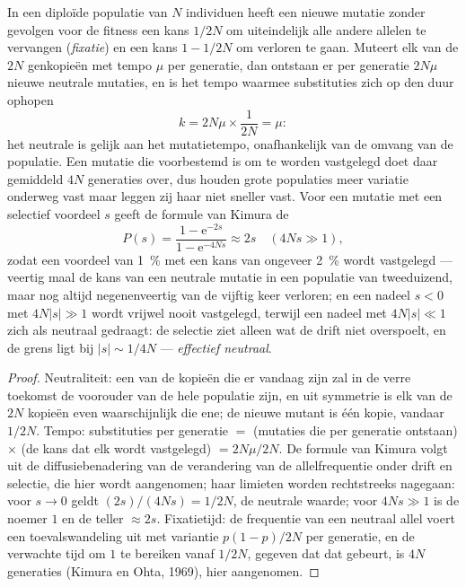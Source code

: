 \begin{theorem}\label{thm:b3:molecular-evolution:neutral}
In een diploïde populatie van $N$ individuen heeft een nieuwe mutatie
zonder gevolgen voor de fitness een kans $1/2N$ om uiteindelijk alle
andere allelen te vervangen (\emph{fixatie}) en een kans $1 - 1/2N$ om
verloren te gaan. Muteert elk van de $2N$ genkopieën met tempo $\mu$
per generatie, dan ontstaan er per generatie $2N\mu$ nieuwe neutrale
mutaties, en is het tempo waarmee substituties zich op den duur ophopen
\[
k = 2N\mu\times\frac{1}{2N} = \mu :
\]
het neutrale \emph{} is gelijk aan het mutatietempo,
onafhankelijk van de omvang van de populatie. Een mutatie die
voorbestemd is om te worden vastgelegd doet daar gemiddeld $4N$
generaties over, dus houden grote populaties meer variatie onderweg
vast maar leggen zij haar niet sneller vast. Voor een mutatie met een
selectief voordeel $s$ geeft de formule van Kimura de 
\[
P(s) = \frac{1 - \mathrm{e}^{-2s}}{1 - \mathrm{e}^{-4Ns}} \approx 2s
\quad (4Ns \gg 1),
\]
zodat een voordeel van \qty{1}{\%} met een kans van ongeveer
\qty{2}{\%} wordt vastgelegd --- veertig maal de kans van een neutrale
mutatie in een populatie van tweeduizend, maar nog altijd
negenenveertig van de vijftig keer verloren; en een nadeel $s < 0$ met
$4N|s| \gg 1$ wordt vrijwel nooit vastgelegd, terwijl een nadeel met
$4N|s| \ll 1$ zich als neutraal gedraagt: de selectie ziet alleen wat
de drift niet overspoelt, en de grens ligt bij $|s| \sim
1/4N$ --- \emph{effectief neutraal}.
\end{theorem}
\begin{proof}
Neutraliteit: een van de kopieën die er vandaag zijn zal in de verre
toekomst de voorouder van de hele populatie zijn, en uit symmetrie is
elk van de $2N$ kopieën even waarschijnlijk die ene; de nieuwe mutant
is één kopie, vandaar $1/2N$. Tempo: substituties per generatie $=$
(mutaties die per generatie ontstaan) $\times$ (de kans dat elk wordt
vastgelegd) $= 2N\mu/2N$. De formule van Kimura volgt uit de
diffusiebenadering van de verandering van de allelfrequentie onder
drift en selectie, die hier wordt aangenomen; haar limieten worden
rechtstreeks nagegaan: voor $s \to 0$ geldt $(2s)/(4Ns) = 1/2N$, de
neutrale waarde; voor $4Ns \gg 1$ is de noemer $1$ en de teller
$\approx 2s$. Fixatietijd: de frequentie van een neutraal allel voert
een toevalswandeling uit met variantie $p(1-p)/2N$ per generatie, en de
verwachte tijd om $1$ te bereiken vanaf $1/2N$, gegeven dat dat
gebeurt, is $4N$ generaties (Kimura en Ohta, 1969), hier aangenomen.
\end{proof}

